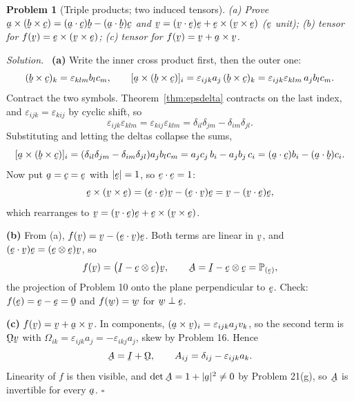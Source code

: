 \documentclass[17pt,a4paper]{extreport}
\DeclareRobustCommand{\vek}[1]{\underaccent{\tilde}{#1}}
\newcommand{\Proj}[1]{\mathbb{P}_{(#1)}}
\newcommand{\I}{\vek{I}}
\newcommand{\ba}{\vek{a}}
\newcommand{\bb}{\vek{b}}
\newcommand{\bc}{\vek{c}}
\newcommand{\bv}{\vek{v}}
\newcommand{\bw}{\vek{w}}
\newcommand{\be}{\vek{e}}
\newcommand{\bze}{\vek{0}}
\newcommand{\bA}{\vek{A}}
\newcommand{\bOm}{\vek{\Omega}}
\newcommand{\dd}{\delta}
\newcommand{\eps}{\varepsilon}
\newcommand{\ip}[2]{#1\cdot#2}
\theoremstyle{scplain}
\theoremstyle{scdefn}
\theoremstyle{scplain}
\newtheorem{problem}{Problem}
\newenvironment{solution}
 {\par\smallskip\noindent\textit{Solution.}\ }
 {\hfill$\square$\par\medskip}
\begin{document}
\begin{problem}[Triple products; two induced tensors]
(a) Prove $\ba\times(\bb\times\bc)=(\ip\ba\bc)\bb-(\ip\ba\bb)\bc$ and
$\bv=(\ip\bv\be)\be+\be\times(\bv\times\be)$ ($\be$ unit); (b) tensor for
$f(\bv)=\be\times(\bv\times\be)$; (c) tensor for $f(\bv)=\bv+\ba\times\bv$.
\end{problem}
\begin{solution}
\textbf{(a)} Write the inner cross product first, then the outer one:
\[
   (\bb\times\bc)_k=\eps_{klm}b_lc_m,
   \qquad
   [\ba\times(\bb\times\bc)]_i=\eps_{ijk}a_j\,(\bb\times\bc)_k
   =\eps_{ijk}\eps_{klm}\,a_jb_lc_m .
\]
Contract the two symbols. Theorem~\ref{thm:epsdelta} contracts on the last
index, and $\eps_{ijk}=\eps_{kij}$ by cyclic shift, so
\[
   \eps_{ijk}\eps_{klm}=\eps_{kij}\eps_{klm}
   =\dd_{il}\dd_{jm}-\dd_{im}\dd_{jl}.
\]
Substituting and letting the deltas collapse the sums,
\[
   [\ba\times(\bb\times\bc)]_i
   =(\dd_{il}\dd_{jm}-\dd_{im}\dd_{jl})a_jb_lc_m
   =a_jc_j\,b_i-a_jb_j\,c_i
   =(\ip\ba\bc)b_i-(\ip\ba\bb)c_i .
\]
Now put $\ba=\bc=\be$ with $|\be|=1$, so $\ip\be\be=1$:
\[
   \be\times(\bv\times\be)=(\ip\be\be)\bv-(\ip\be\bv)\be
   =\bv-(\ip\bv\be)\be ,
\]
which rearranges to $\bv=(\ip\bv\be)\be+\be\times(\bv\times\be)$.

\textbf{(b)} From (a), $f(\bv)=\bv-(\ip\be\bv)\be$. Both terms are linear
in $\bv$, and $(\ip\be\bv)\be=(\be\otimes\be)\bv$, so
\[
   f(\bv)=\big(\I-\be\otimes\be\big)\bv,
   \qquad \bA=\I-\be\otimes\be=\Proj\be ,
\]
the projection of Problem 10 onto the plane perpendicular to $\be$. Check:
$f(\be)=\be-\be=\bze$ and $f(\bw)=\bw$ for $\bw\perp\be$.

\textbf{(c)} $f(\bv)=\bv+\ba\times\bv$. In components,
$(\ba\times\bv)_i=\eps_{ijk}a_jv_k$, so the second term is
$\bOm\bv$ with $\Omega_{ik}=\eps_{ijk}a_j=-\eps_{ikj}a_j$, skew by
Problem 16. Hence
\[
   \bA=\I+\bOm,\qquad A_{ij}=\dd_{ij}-\eps_{ijk}a_k .
\]
Linearity of $f$ is then visible, and $\det\bA=1+|\ba|^{2}\neq0$ by
Problem 21(g), so $\bA$ is invertible for every $\ba$.
\end{solution}
\end{document}
